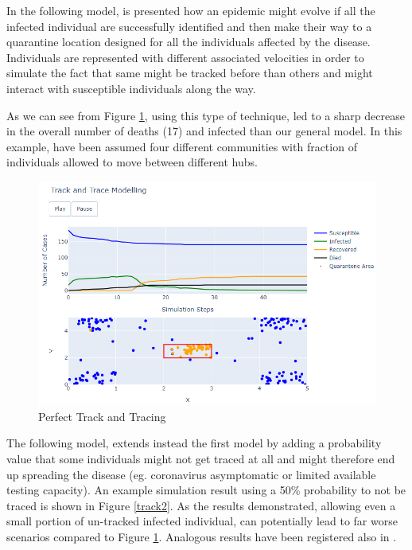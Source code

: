 In the following model, is presented how an epidemic might evolve if all the infected individual are successfully identified and then make their way to a quarantine location designed for all the individuals affected by the disease. Individuals are represented with different associated velocities in order to simulate the fact that same might be tracked before than others and might interact with susceptible individuals along the way.

As we can see from Figure \ref{track1}, using this type of technique, led to a sharp decrease in the overall number of deaths (17) and infected than our general model. In this example, have been assumed four different communities with fraction of individuals allowed to move between different hubs. 

\begin{figure}[ht!]%
    \centering
    \includegraphics[width=13cm]{latex/images/track1.PNG}%
    \caption{Perfect Track and Tracing}
    \label{track1}
\end{figure}

The following model, extends instead the first model by adding a probability value that some individuals might not get traced at all and might therefore end up spreading the disease (eg. coronavirus asymptomatic or limited available testing capacity). An example simulation result using a 50\% probability to not be traced is shown in Figure \ref{track2}. As the results demonstrated, allowing even a small portion of un-tracked infected individual, can potentially lead to far worse scenarios compared to Figure \ref{track1}. Analogous results have been registered also in \cite{epic}.


